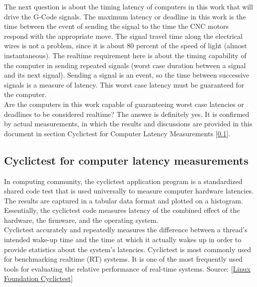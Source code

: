 The next question is about the timing latency of computers in this work that will drive the G-Code signals. The maximum latency or deadline in this work is the time between the event of sending the signal to the time the CNC motors respond with the appropriate move. The signal travel time along the electrical wires is not a problem, since it is about 80 percent of the speed of light (almost instantaneous). The realtime requirement here is about the timing capability of the computer in sending repeated signals (worst case duration between a signal and its next signal). Sending a signal is an event, so the time between successive signals is a measure of latency. This worst case latency must be guaranteed for the computer.\\ 

Are the computers in this work capable of guaranteeing worst case latencies or deadlines to be considered realtime? The answer is definitely yes. It is confirmed by actual measurements, in which the results and discussions are provided in this document in section Cyclictest for Computer Latency Measurements [\ref{app4-Cyclictest for computer latency measurements}].  

 
\clearpage
\pagebreak

\subsection{Cyclictest for computer latency measurements}
\label{app4-Cyclictest for computer latency measurements}

In computing community, the cyclictest application program is a standardized shared code test that is used universally to measure computer hardware latencies. The results are captured in a tabular data format and plotted on a histogram. Essentially, the cyclictest code measures latency of the combined effect of the hardware, the firmware, and the operating system. \\

Cyclictest accurately and repeatedly measures the difference between a thread's intended wake-up time and the time at which it actually wakes up in order to provide statistics about the system's latencies. Cyclictest is most commonly used for benchmarking realtime (RT) systems. It is one of the most frequently used tools for evaluating the relative performance of real-time systems. Source: [\href{https://wiki.linuxfoundation.org/realtime/documentation/howto/tools/cyclictest/start}{Linux Foundation Cyclictest}] \\ 

